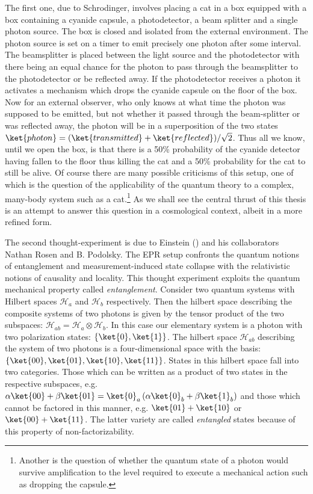 \documentclass[11pt,english,rmp]{revtex4}
\begin{document}
The first one, due to Schrodinger, involves placing a cat in a box equipped with a box containing a cyanide capsule, a photodetector, a beam splitter and a single photon source. The box is closed and isolated from the external environment. The photon source is set on a timer to emit precisely one photon after some interval. The beamsplitter is placed between the light source and the photodetector with there being an equal chance for the photon to pass through the beamsplitter to the photodetector or be reflected away. If the photodetector receives a photon it activates a mechanism which drops the cyanide capsule on the floor of the box. Now for an external observer, who only knows at what time the photon was supposed to be emitted, but not whether it passed through the beam-splitter or was reflected away, the photon will be in a superposition of the two states $\ket{photon} = (\ket{transmitted}+\ket{reflected})/\sqrt{2}$. Thus all we know, until we open the box, is that there is a 50\% probability of the cyanide detector having fallen to the floor thus killing the cat and a 50\% probability for the cat to still be alive. Of course there are many possible criticisms of this setup, one of which is the question of the applicability of the quantum theory to a complex, many-body system such as a cat.\footnote{Another is the question of whether the quantum state of a photon would survive amplification to the level required to execute a mechanical action such as dropping the capsule.} As we shall see the central thrust of this thesis is an attempt to answer this question in a cosmological context, albeit in a more refined form.

The second thought-experiment is due to Einstein (\cite{Einstein1935_EPR}) and his collaborators Nathan Rosen and B. Podolsky. The EPR setup confronts the quantum notions of entanglement and measurement-induced state collapse with the relativistic notions of causality and locality. This thought experiment exploits the quantum mechanical property called \emph{entanglement}. Consider two quantum systems with Hilbert spaces $\mathcal{H}_a$ and $\mathcal{H}_b$ respectively. Then the hilbert space describing the composite systems of two photons is given by the tensor product of the two subspaces: $\mathcal{H}_{ab} = \mathcal{H}_a \otimes \mathcal{H}_b$. In this case our elementary system is a photon with two polarization states: $\{\ket{0},\ket{1}\}$. The hilbert space $\mathcal{H}_{ab}$ describing the system of two photons is a four-dimensional space with the basis: $\{ \ket{00}, \ket{01}, \ket{10}, \ket{11} \}$. States in this hilbert space fall into two categories. Those which can be written as a product of two states in the respective subspaces, e.g. $\alpha \ket{00} + \beta \ket{01} = \ket{0}_a \left( \alpha \ket{0}_b + \beta \ket{1}_b \right)$ and those which cannot be factored in this manner, e.g. $\ket{01} + \ket{10}$ or $\ket{00} + \ket{11}$. The latter variety are called \emph{entangled} states because of this property of non-factorizability.
\end{document}
